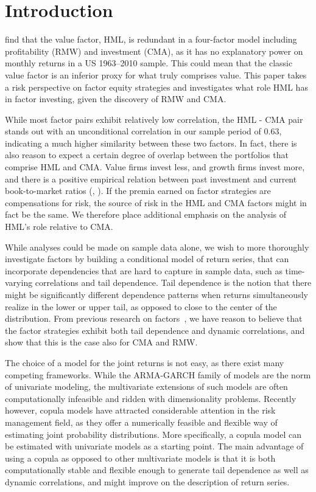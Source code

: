\section{Introduction}
\textcite{FF2015} find that the value factor, HML, is redundant in a four-factor model including profitability (RMW) and investment (CMA), as it has no explanatory power on monthly returns in a US 1963–2010 sample. This could mean that the classic value factor is an inferior proxy for what truly comprises value. This paper takes a risk perspective on factor equity strategies and investigates what role HML has in factor investing, given the discovery of RMW and CMA. 

While most factor pairs exhibit relatively low correlation, the HML - CMA pair stands out with an unconditional correlation in our sample period of 0.63, indicating a much higher similarity between these two factors. In fact, there is also reason to expect a certain degree of overlap between the portfolios that comprise HML and CMA. Value firms invest less, and growth firms invest more, and there is a positive empirical relation between past investment and current book-to-market ratios (\textcite{Zhang2005}, \textcite{AndersonGarciaFeijoo2006}). If the premia earned on factor strategies are compensations for risk, the source of risk in the HML and CMA factors might in fact be the same. We therefore place additional emphasis on the analysis of HML's role relative to CMA.

While analyses could be made on sample data alone, we wish to more thoroughly investigate factors by building a conditional model of return series, that can incorporate dependencies that are hard to capture in sample data, such as time-varying correlations and tail dependence. Tail dependence is the notion that there might be significantly different dependence patterns when returns simultaneously realize in the lower or upper tail, as opposed to close to the center of the distribution. From previous research on factors~\autocite{ChristoffersenLanglois2013}, we have reason to believe that the factor strategies exhibit both tail dependence and dynamic correlations, and show that this is the case also for CMA and RMW.

The choice of a model for the joint returns is not easy, as there exist many competing frameworks. While the ARMA-GARCH family of models are the norm of univariate modeling, the multivariate extensions of such models are often computationally infeasible and ridden with dimensionality problems. Recently however, copula models have attracted considerable attention in the risk management field, as they offer a numerically feasible and flexible way of estimating joint probability distributions. More specifically, a copula model can be estimated with univariate models as a starting point. The main advantage of using a copula as opposed to other multivariate models is that it is both computationally stable and flexible enough to generate tail dependence as well as dynamic correlations, and might improve on the description of return series. 

